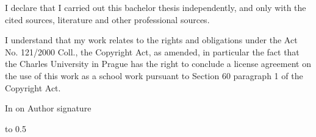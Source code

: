 

\newpage
\openright


\noindent
I declare that I carried out this bachelor thesis independently, and only with the cited
sources, literature and other professional sources.

\medskip\noindent
I understand that my work relates to the rights and obligations under the Act No.
121/2000 Coll., the Copyright Act, as amended, in particular the fact that the Charles
University in Prague has the right to conclude a license agreement on the use of this
work as a school work pursuant to Section 60 paragraph 1 of the Copyright Act.

\vspace{18mm}
\noindent
In \makebox[4cm]{\dotfill} on \makebox[2.5cm]{\dotfill}
\hspace*{\fill}
Author signature
\hspace*{\fill}




\newpage

\vbox to 0.5

